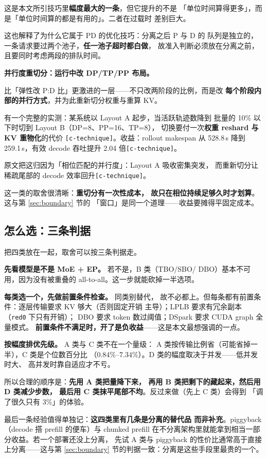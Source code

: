 \noindent 这是本文所引技巧里\textbf{幅度最大的一条}，但它提升的不是
「单位时间算得更多」，而是「单位时间算的都是有用的」。二者在过载时
差别巨大。

\noindent 这也解释了为什么它属于 PD 的优化技巧：分离之后 P 与 D 的
队列是独立的，一条请求要过两个池子，\textbf{任一池子超时都白做}，
故准入判断必须放在分离之前，且要同时考虑两段的排队时间。

\noindent\textbf{ 并行度重切分：运行中改 DP/TP/PP 布局。}

比「弹性改 P:D 比」更激进的一层——不只改两阶段的比例，而是改
\textbf{每个阶段内部的并行方式}，并为此重新切分权重与重算 KV。

\noindent 有一个完整的实测：某系统以 Layout A 起步，当活跃轨迹数降到
批量的 10\% 以下时切到 Layout B（DP=8、PP=16、TP=8），
切换要付一次\textbf{权重 reshard 与 KV 重物化}的代价
\texttt{[c-technique]}。收益：rollout makespan 从 528.8\,s 降到
259.1\,s，有效 decode 吞吐提升 2.04 倍\texttt{[c-technique]}。

\noindent 原文把这归因为「相位匹配的并行度」：Layout A 吸收密集突发，
而重新切分让稀疏尾部的 decode 效率回升\texttt{[c-technique]}。

\noindent 这一类的取舍很清晰：\textbf{重切分有一次性成本，
故只在相位持续足够久时才划算}。这与第 \ref{sec:boundary} 节的
「窗口」是同一个道理——收益要摊得平固定成本。

\subsection{怎么选：三条判据}

把四类放在一起，取舍可以按三条判据走。

\noindent\textbf{ 先看模型是不是 MoE + EP。} 若不是，B 类（TBO/SBO/
DBO）基本不可用，因为没有被重叠的 all-to-all。这一步就能砍掉一半选项。

\noindent\textbf{ 每类选一个，先做前置条件检查。} 同类别替代，
故不必都上。但每条都有前置条件：逐层传输要求 KV 够大（否则固定开销
主导）；LPLB 要求有冗余副本（\texttt{red0} 下只有开销）；
DBO 要求 token 数过阈值；DSpark 要求 CUDA graph 全量模式。
\textbf{前置条件不满足时，开了是负收益}——这是本文最想强调的一点。

\noindent\textbf{ 按幅度排优先级。} A 类与 C 类不在一个量级：
A 类按传输比例省（可能省掉一半），C 类是个位数百分比
（$0.84\%$--$7.34\%$）。D 类的幅度取决于并发——低并发时大、
高并发时靠自适应才不亏。

\noindent 所以合理的顺序是：\textbf{先用 A 类把量降下来，
再用 B 类把剩下的藏起来，然后用 D 类减少步数，
最后用 C 类抹平尾部不均}。反过来做（先上 C 类）会得到
「调了很久只有 3\%」的体验。

\noindent 最后一条经验值得单独记：\textbf{这四类里有几条是分离的替代品
而非补充}。piggyback（decode 搭 prefill 的便车）与 chunked prefill
在不分离架构里就能拿到相当一部分收益。若一个部署还没上分离，
先试 A 类与 piggyback 的性价比通常高于直接上分离——这与第
\ref{sec:boundary} 节的判据一致：分离是这些手段里最贵的一个。
